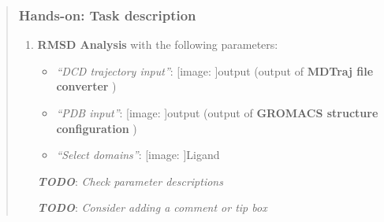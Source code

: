 \documentclass[twocolumn]{bmcart}%
\def\texttt{[image: ]}
\providecommand{\tightlist}{%
  \setlength{\itemsep}{0pt}\setlength{\parskip}{0pt}}
\begin{document}
\begin{quote}
\hypertarget{hands-on-task-description-10}{%
\subsubsection{Hands-on: Task
description}\label{hands-on-task-description-10}}

\begin{enumerate}
\def\labelenumi{\arabic{enumi}.}
\tightlist
\item
  \textbf{RMSD Analysis} with the following parameters:

  \begin{itemize}
  \tightlist
  \item
    \emph{``DCD trajectory input''}: \texttt{output} (output of
    \textbf{MDTraj file converter} )
  \item
    \emph{``PDB input''}: \texttt{output} (output of \textbf{GROMACS
    structure configuration} )
  \item
    \emph{``Select domains''}: \texttt{Ligand}
  \end{itemize}

  \textbf{\emph{TODO}}: \emph{Check parameter descriptions}

  \textbf{\emph{TODO}}: \emph{Consider adding a comment or tip box}
\end{enumerate}


\end{quote}
\end{document}
